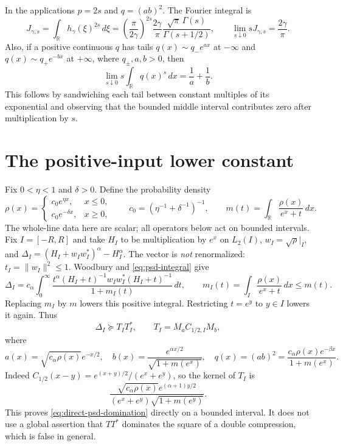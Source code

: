 \documentclass[11pt]{article}
\numberwithin{equation}{section}
\newcommand{\R}{\mathbb R}
\begin{document}
In the applications $p=2s$ and $q=(ab)^2$. The Fourier integral is
\begin{equation}\label{eq:gamma-integral}
 J_{\gamma,s}=\int_\R h_\gamma(\xi)^{2s}\,d\xi
 =\left(\frac\pi{2\gamma}\right)^{2s}
       \frac{2\gamma}{\pi}
       \frac{\sqrt\pi\,\Gamma(s)}{\Gamma(s+1/2)},
 \qquad \lim_{s\downarrow0}sJ_{\gamma,s}=\frac{2\gamma}{\pi}.
\end{equation}
Also, if a positive continuous $q$ has tails
$q(x)\sim q_-e^{a x}$ at $-\infty$ and
$q(x)\sim q_+e^{-b x}$ at $+\infty$, where $q_\pm,a,b>0$, then
\begin{equation}\label{eq:tail-integral}
 \lim_{s\downarrow0}s\int_\R q(x)^s\,dx=\frac1a+\frac1b.
\end{equation}
This follows by sandwiching each tail between constant multiples of
its exponential and observing that the bounded middle interval
contributes zero after multiplication by $s$.

\section{The positive-input lower constant}

Fix $0<\eta<1$ and $\delta>0$. Define the probability density
\begin{equation}\label{eq:psd-density}
 \rho(x)=\begin{cases}c_0e^{\eta x},&x\le0,\\
                      c_0e^{-\delta x},&x\ge0,
        \end{cases}
 \qquad c_0=(\eta^{-1}+\delta^{-1})^{-1},
 \qquad m(t)=\int_\R\frac{\rho(x)}{e^x+t}\,dx.
\end{equation}
The whole-line data here are scalar; all operators below act on bounded
intervals. Fix
$I=[-R,R]$ and take $H_I$ to be multiplication by $e^x$ on $L_2(I)$,
$w_I=\sqrt\rho|_I$, and
$\Delta_I=(H_I+w_Iw_I^*)^\alpha-H_I^\alpha$.
The vector is \emph{not} renormalized: $t_I=\|w_I\|^2\le1$.
Woodbury and \eqref{eq:psd-integral} give
\begin{equation}\label{eq:psd-woodbury}
 \Delta_I=c_\alpha\int_0^\infty
 \frac{t^\alpha(H_I+t)^{-1}w_Iw_I^*(H_I+t)^{-1}}
       {1+m_I(t)}\,dt,
 \qquad m_I(t)=\int_I\frac{\rho(x)}{e^x+t}\,dx\le m(t).
\end{equation}
Replacing $m_I$ by $m$ lowers this positive integral. Restricting
$t=e^y$ to $y\in I$ lowers it again. Thus
\begin{equation}\label{eq:direct-psd-domination}
 \Delta_I\succeq T_I T_I^*,\qquad
 T_I=M_a C_{1/2,I}M_b,
\end{equation}
where
\begin{equation}\label{eq:psd-weights}
 a(x)=\sqrt{c_\alpha\rho(x)}e^{-x/2},\quad
 b(x)=\frac{e^{\alpha x/2}}{\sqrt{1+m(e^x)}},\quad
 q(x)=(ab)^2=\frac{c_\alpha\rho(x)e^{-\beta x}}{1+m(e^x)}.
\end{equation}
Indeed $C_{1/2}(x-y)=e^{(x+y)/2}/(e^x+e^y)$, so the kernel of $T_I$ is
\[
 \frac{\sqrt{c_\alpha\rho(x)}e^{(\alpha+1)y/2}}
       {(e^x+e^y)\sqrt{1+m(e^y)}}.
\]
This proves \eqref{eq:direct-psd-domination} directly on a bounded
interval. It does not use a global assertion that $TT^*$ dominates
the square of a double compression, which is false in general.
\end{document}
